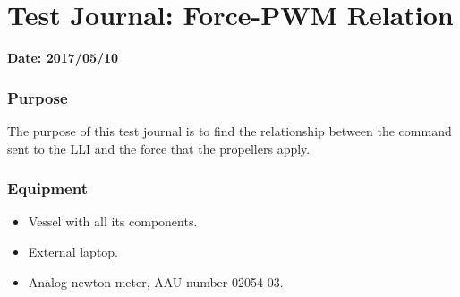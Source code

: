 \chapter{Test Journal: Force-PWM Relation}\label{app:forceTest}

\textbf{Date: 2017/05/10}

\subsection*{Purpose}
The purpose of this test journal is to find the relationship between the command sent to the LLI and the force that the propellers apply.


\subsection*{Equipment}
\begin{itemize}
	\item Vessel with all its components.
	\item External laptop.
    \item Analog newton meter, AAU number 02054-03.
\end{itemize}

